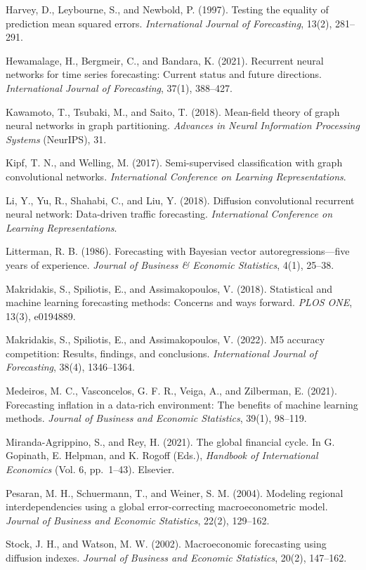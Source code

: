 \documentclass[
]{article}
\begin{document}
Harvey, D., Leybourne, S., and Newbold, P. (1997). Testing the equality
of prediction mean squared errors. \emph{International Journal of
Forecasting}, 13(2), 281--291.

Hewamalage, H., Bergmeir, C., and Bandara, K. (2021). Recurrent neural
networks for time series forecasting: Current status and future
directions. \emph{International Journal of Forecasting}, 37(1),
388--427.

Kawamoto, T., Tsubaki, M., and Saito, T. (2018). Mean-field theory of
graph neural networks in graph partitioning. \emph{Advances in Neural
Information Processing Systems} (NeurIPS), 31.

Kipf, T. N., and Welling, M. (2017). Semi-supervised classification with
graph convolutional networks. \emph{International Conference on Learning
Representations}.

Li, Y., Yu, R., Shahabi, C., and Liu, Y. (2018). Diffusion convolutional
recurrent neural network: Data-driven traffic forecasting.
\emph{International Conference on Learning Representations}.

Litterman, R. B. (1986). Forecasting with Bayesian vector
autoregressions---five years of experience. \emph{Journal of Business
\& Economic Statistics}, 4(1), 25--38.

Makridakis, S., Spiliotis, E., and Assimakopoulos, V. (2018).
Statistical and machine learning forecasting methods: Concerns and ways
forward. \emph{PLOS ONE}, 13(3), e0194889.

Makridakis, S., Spiliotis, E., and Assimakopoulos, V. (2022). M5
accuracy competition: Results, findings, and conclusions.
\emph{International Journal of Forecasting}, 38(4), 1346--1364.

Medeiros, M. C., Vasconcelos, G. F. R., Veiga, A., and Zilberman, E.
(2021). Forecasting inflation in a data-rich environment: The benefits
of machine learning methods. \emph{Journal of Business and Economic
Statistics}, 39(1), 98--119.

Miranda-Agrippino, S., and Rey, H. (2021). The global financial cycle.
In G. Gopinath, E. Helpman, and K. Rogoff (Eds.), \emph{Handbook of
International Economics} (Vol. 6, pp.~1--43). Elsevier.

Pesaran, M. H., Schuermann, T., and Weiner, S. M. (2004). Modeling regional interdependencies using a global error-correcting macroeconometric model. \emph{Journal of Business and Economic Statistics}, 22(2), 129--162.

Stock, J. H., and Watson, M. W. (2002). Macroeconomic forecasting using diffusion indexes. \emph{Journal of Business and Economic Statistics}, 20(2), 147--162.
\end{document}
